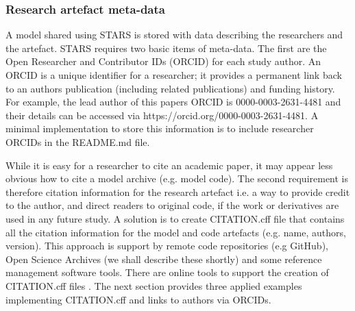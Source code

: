 \documentclass[]{interact}
\theoremstyle{plain}%
\theoremstyle{definition}
\theoremstyle{remark}
\begin{document}
\subsubsection{Research artefact meta-data}

A model shared using STARS is stored with data describing the researchers and the artefact. STARS requires two basic items of meta-data. The first are the Open Researcher and Contributor IDs (ORCID) for each study author. An ORCID is a unique identifier for a researcher; it provides a permanent link back to an authors publication (including related publications) and funding history. For example, the lead author of this papers ORCID is 0000-0003-2631-4481 and their details can be accessed via https://orcid.org/0000-0003-2631-4481. A minimal implementation to store this information is to include researcher ORCIDs in the README.md file.

While it is easy for a researcher to cite an academic paper, it may appear less obvious how to cite a model archive (e.g. model code). The second requirement is therefore citation information for the research artefact i.e. a way to provide credit to the author, and direct readers to original code, if the work or derivatives are used in any future study. A solution is to create CITATION.cff file that contains all the citation information for the model and code artefacts (e.g. name, authors, version).  This approach is support by remote code repositories (e.g GitHub), Open Science Archives (we shall describe these shortly) and some reference management software tools.  There are online tools to support the creation of CITATION.cff files \citep{druskat_stephan_2021_5171937}. The next section provides three applied examples implementing CITATION.cff and links to authors via ORCIDs.
\end{document}
